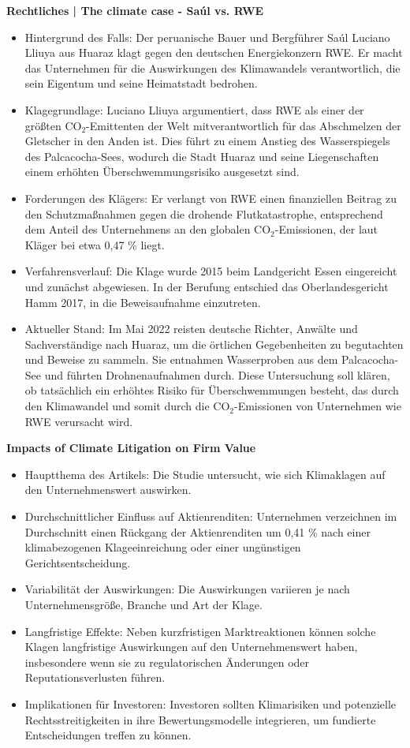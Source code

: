 \documentclass[a4paper, 12pt]{article} %
\begin{document}
\textbf{\cite{RechtlichesClimateCase2022} Rechtliches | The climate case - Saúl vs. RWE}

\begin{itemize}
   \item Hintergrund des Falls: Der peruanische Bauer und Bergführer Saúl Luciano Lliuya aus Huaraz klagt gegen den deutschen Energiekonzern RWE. Er macht das Unternehmen für die Auswirkungen des Klimawandels verantwortlich, die sein Eigentum und seine Heimatstadt bedrohen.
   \item Klagegrundlage: Luciano Lliuya argumentiert, dass RWE als einer der größten CO$_2$-Emittenten der Welt mitverantwortlich für das Abschmelzen der Gletscher in den Anden ist. Dies führt zu einem Anstieg des Wasserspiegels des Palcacocha-Sees, wodurch die Stadt Huaraz und seine Liegenschaften einem erhöhten Überschwemmungsrisiko ausgesetzt sind.
   \item Forderungen des Klägers: Er verlangt von RWE einen finanziellen Beitrag zu den Schutzmaßnahmen gegen die drohende Flutkatastrophe, entsprechend dem Anteil des Unternehmens an den globalen CO$_2$-Emissionen, der laut Kläger bei etwa 0,47 \% liegt. 
   \item Verfahrensverlauf: Die Klage wurde 2015 beim Landgericht Essen eingereicht und zunächst abgewiesen. In der Berufung entschied das Oberlandesgericht Hamm 2017, in die Beweisaufnahme einzutreten. 
   \item Aktueller Stand: Im Mai 2022 reisten deutsche Richter, Anwälte und Sachverständige nach Huaraz, um die örtlichen Gegebenheiten zu begutachten und Beweise zu sammeln. Sie entnahmen Wasserproben aus dem Palcacocha-See und führten Drohnenaufnahmen durch. Diese Untersuchung soll klären, ob tatsächlich ein erhöhtes Risiko für Überschwemmungen besteht, das durch den Klimawandel und somit durch die CO$_2$-Emissionen von Unternehmen wie RWE verursacht wird. 
\end{itemize}

\textbf{\cite{sato2024impacts} Impacts of Climate Litigation on Firm Value}

\begin{itemize}
   \item Hauptthema des Artikels: Die Studie untersucht, wie sich Klimaklagen auf den Unternehmenswert auswirken.
   \item Durchschnittlicher Einfluss auf Aktienrenditen: Unternehmen verzeichnen im Durchschnitt einen Rückgang der Aktienrenditen um 0,41 \% nach einer klimabezogenen Klageeinreichung oder einer ungünstigen Gerichtsentscheidung.
   \item Variabilität der Auswirkungen: Die Auswirkungen variieren je nach Unternehmensgröße, Branche und Art der Klage.
   \item Langfristige Effekte: Neben kurzfristigen Marktreaktionen können solche Klagen langfristige Auswirkungen auf den Unternehmenswert haben, insbesondere wenn sie zu regulatorischen Änderungen oder Reputationsverlusten führen.
   \item Implikationen für Investoren: Investoren sollten Klimarisiken und potenzielle Rechtsstreitigkeiten in ihre Bewertungsmodelle integrieren, um fundierte Entscheidungen treffen zu können.
\end{itemize}
\end{document}
